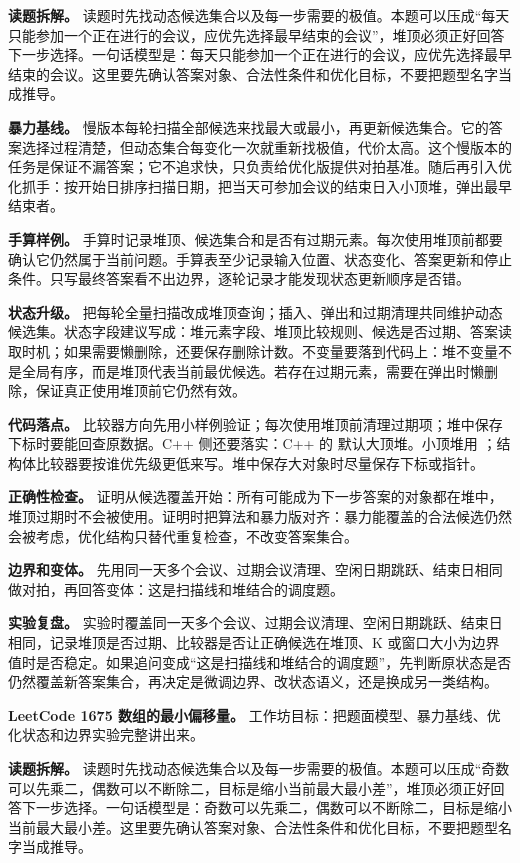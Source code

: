 \textbf{读题拆解。} 读题时先找动态候选集合以及每一步需要的极值。本题可以压成“每天只能参加一个正在进行的会议，应优先选择最早结束的会议”，堆顶必须正好回答下一步选择。一句话模型是：每天只能参加一个正在进行的会议，应优先选择最早结束的会议。这里要先确认答案对象、合法性条件和优化目标，不要把题型名字当成推导。

\textbf{暴力基线。} 慢版本每轮扫描全部候选来找最大或最小，再更新候选集合。它的答案选择过程清楚，但动态集合每变化一次就重新找极值，代价太高。这个慢版本的任务是保证不漏答案；它不追求快，只负责给优化版提供对拍基准。随后再引入优化抓手：按开始日排序扫描日期，把当天可参加会议的结束日入小顶堆，弹出最早结束者。

\textbf{手算样例。} 手算时记录堆顶、候选集合和是否有过期元素。每次使用堆顶前都要确认它仍然属于当前问题。手算表至少记录输入位置、状态变化、答案更新和停止条件。只写最终答案看不出边界，逐轮记录才能发现状态更新顺序是否错。

\textbf{状态升级。} 把每轮全量扫描改成堆顶查询；插入、弹出和过期清理共同维护动态候选集。状态字段建议写成：堆元素字段、堆顶比较规则、候选是否过期、答案读取时机；如果需要懒删除，还要保存删除计数。不变量要落到代码上：堆不变量不是全局有序，而是堆顶代表当前最优候选。若存在过期元素，需要在弹出时懒删除，保证真正使用堆顶前它仍然有效。

\textbf{代码落点。} 比较器方向先用小样例验证；每次使用堆顶前清理过期项；堆中保存下标时要能回查原数据。C++ 侧还要落实：C++ 的  默认大顶堆。小顶堆用 ；结构体比较器要按谁优先级更低来写。堆中保存大对象时尽量保存下标或指针。

\textbf{正确性检查。} 证明从候选覆盖开始：所有可能成为下一步答案的对象都在堆中，堆顶过期时不会被使用。证明时把算法和暴力版对齐：暴力能覆盖的合法候选仍然会被考虑，优化结构只替代重复检查，不改变答案集合。

\textbf{边界和变体。} 先用同一天多个会议、过期会议清理、空闲日期跳跃、结束日相同做对拍，再回答变体：这是扫描线和堆结合的调度题。

\textbf{实验复盘。} 实验时覆盖同一天多个会议、过期会议清理、空闲日期跳跃、结束日相同，记录堆顶是否过期、比较器是否让正确候选在堆顶、K 或窗口大小为边界值时是否稳定。如果追问变成“这是扫描线和堆结合的调度题”，先判断原状态是否仍然覆盖新答案集合，再决定是微调边界、改状态语义，还是换成另一类结构。

\noindent\textbf{LeetCode 1675 数组的最小偏移量。} 工作坊目标：把题面模型、暴力基线、优化状态和边界实验完整讲出来。

\textbf{读题拆解。} 读题时先找动态候选集合以及每一步需要的极值。本题可以压成“奇数可以先乘二，偶数可以不断除二，目标是缩小当前最大最小差”，堆顶必须正好回答下一步选择。一句话模型是：奇数可以先乘二，偶数可以不断除二，目标是缩小当前最大最小差。这里要先确认答案对象、合法性条件和优化目标，不要把题型名字当成推导。


